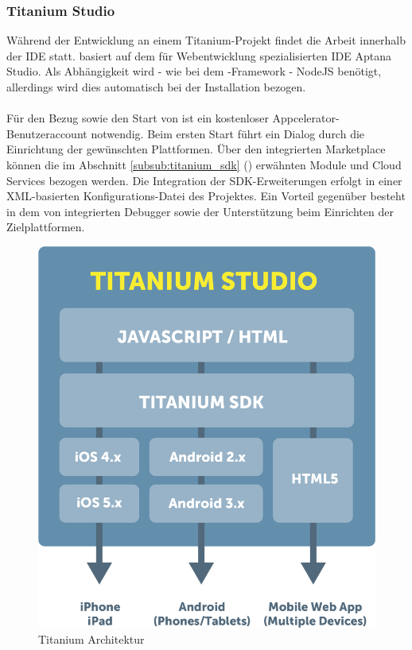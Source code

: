 \documentclass[../Bachelorarbeit.tex]{subfiles}
\begin{document}
\subsubsection*{Titanium Studio}
\label{subsub:titanium_studio}
Während der Entwicklung an einem Titanium-Projekt findet die Arbeit innerhalb der \ac{IDE}  statt. 
 basiert auf dem für Webentwicklung  spezialisierten \ac{IDE} Aptana Studio.
Als Abhängigkeit wird - wie bei dem -Framework - NodeJS benötigt, allerdings wird dies automatisch bei der Installation bezogen.\\
\\
Für den Bezug sowie den Start von  ist ein kostenloser Appcelerator-Benutzeraccount notwendig.
Beim ersten Start führt ein Dialog durch die Einrichtung der gewünschten Plattformen.
Über den integrierten Marketplace können die im Abschnitt \ref{subsub:titanium_sdk} () erwähnten Module und Cloud Services bezogen werden. 
Die Integration der \ac{SDK}-Erweiterungen erfolgt in einer \ac{XML}-basierten Konfigurations-Datei des Projektes.
Ein Vorteil gegenüber  besteht in dem von  integrierten Debugger sowie der Unterstützung beim Einrichten der Zielplattformen. 

\begin{figure}
\centering
\includegraphics[width=0.8\linewidth]{./img/titanium_studio_architecture}
\caption[Titanium Architektur]{Titanium Architektur \parencite[Quelle:][]{titanium_architektur}}
\label{fig:titanium_studio_architecture}
\end{figure}
\end{document}
